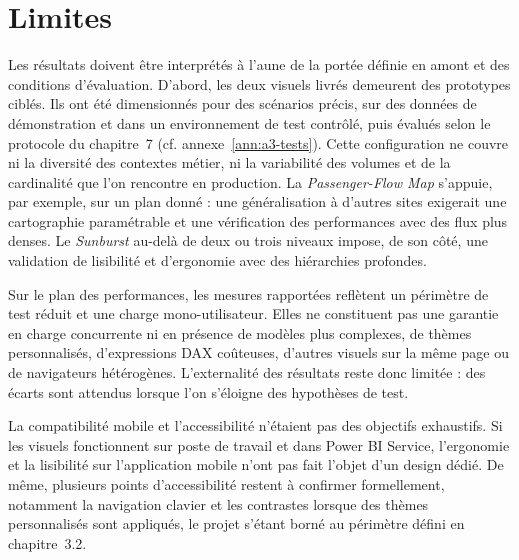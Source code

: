 
\section{Limites}
\label{sec:chap8-limites}

Les résultats doivent être interprétés à l’aune de la portée définie en amont et des conditions d’évaluation. D’abord, les deux visuels livrés demeurent des prototypes ciblés. Ils ont été dimensionnés pour des scénarios précis, sur des données de démonstration et dans un environnement de test contrôlé, puis évalués selon le protocole du chapitre~7 (cf. annexe~\ref{ann:a3-tests}). Cette configuration ne couvre ni la diversité des contextes métier, ni la variabilité des volumes et de la cardinalité que l’on rencontre en production. La \textit{Passenger-Flow Map} s’appuie, par exemple, sur un plan donné : une généralisation à d’autres sites exigerait une cartographie paramétrable et une vérification des performances avec des flux plus denses. Le \textit{Sunburst} au-delà de deux ou trois niveaux impose, de son côté, une validation de lisibilité et d’ergonomie avec des hiérarchies profondes.

Sur le plan des performances, les mesures rapportées reflètent un périmètre de test réduit et une charge mono-utilisateur. Elles ne constituent pas une garantie en charge concurrente ni en présence de modèles plus complexes, de thèmes personnalisés, d’expressions DAX coûteuses, d’autres visuels sur la même page ou de navigateurs hétérogènes. L’externalité des résultats reste donc limitée : des écarts sont attendus lorsque l’on s’éloigne des hypothèses de test.

La compatibilité mobile et l’accessibilité n’étaient pas des objectifs exhaustifs. Si les visuels fonctionnent sur poste de travail et dans Power BI Service, l’ergonomie et la lisibilité sur l’application mobile n’ont pas fait l’objet d’un design dédié. De même, plusieurs points d’accessibilité restent à confirmer formellement, notamment la navigation clavier et les contrastes lorsque des thèmes personnalisés sont appliqués, le projet s’étant borné au périmètre défini en chapitre~3.2.

